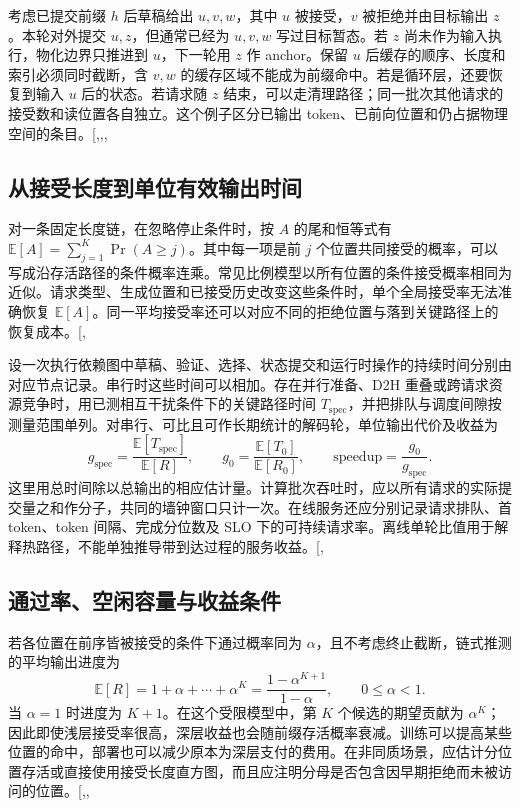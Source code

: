 \documentclass[
  a4paper,
  UTF8,
  fontset=none,
  zihao=5]{ctexart}
\begin{document}
考虑已提交前缀 \(h\) 后草稿给出 \(u,v,w\)，其中 \(u\) 被接受，\(v\)
被拒绝并由目标输出 \(z\)。本轮对外提交 \(u,z\)，但通常已经为 \(u,v,w\)
写过目标暂态。若 \(z\) 尚未作为输入执行，物化边界只推进到
\(u\)，下一轮用 \(z\) 作 anchor。保留 \(u\)
后缓存的顺序、长度和索引必须同时截断，含 \(v,w\)
的缓存区域不能成为前缀命中。若是循环层，还要恢复到输入 \(u\)
后的状态。若请求随 \(z\)
结束，可以走清理路径；同一批次其他请求的接受数和读位置各自独立。这个例子区分已输出
token、已前向位置和仍占据物理空间的条目。{[},,,\citeproc{ref-pagedattention}{34}{]}

\subsection{从接受长度到单位有效输出时间}\label{cost}

对一条固定长度链，在忽略停止条件时，按 \(A\) 的尾和恒等式有
\(\mathbb{E}[A]=\sum_{j=1}^{K}\Pr(A\ge j)\)。其中每一项是前 \(j\)
个位置共同接受的概率，可以写成沿存活路径的条件概率连乘。常见比例模型以所有位置的条件接受概率相同为近似。请求类型、生成位置和已接受历史改变这些条件时，单个全局接受率无法准确恢复
\(\mathbb{E}[A]\)。同一平均接受率还可以对应不同的拒绝位置与落到关键路径上的恢复成本。{[},\citeproc{ref-chen}{3}{]}

设一次执行依赖图中草稿、验证、选择、状态提交和运行时操作的持续时间分别由对应节点记录。串行时这些时间可以相加。存在并行准备、D2H
重叠或跨请求资源竞争时，用已测相互干扰条件下的关键路径时间
\(T_{\mathrm{spec}}\)，并把排队与调度间隙按测量范围单列。对串行、可比且可作长期统计的解码轮，单位输出代价及收益为
\[
g_{\mathrm{spec}}=\frac{\mathbb{E}[T_{\mathrm{spec}}]}{\mathbb{E}[R]},\qquad
g_0=\frac{\mathbb{E}[T_0]}{\mathbb{E}[R_0]},\qquad
\text{speedup}=\frac{g_0}{g_{\mathrm{spec}}} .
\]
这里用总时间除以总输出的相应估计量。计算批次吞吐时，应以所有请求的实际提交量之和作分子，共同的墙钟窗口只计一次。在线服务还应分别记录请求排队、首
token、token 间隔、完成分位数及 SLO
下的可持续请求率。离线单轮比值用于解释热路径，不能单独推导带到达过程的服务收益。{[},\citeproc{ref-smartspec}{6}{]}

\subsection{通过率、空闲容量与收益条件}\label{break-even}

若各位置在前序皆被接受的条件下通过概率同为
\(\alpha\)，且不考虑终止截断，链式推测的平均输出进度为 \[
\mathbb{E}[R]=1+\alpha+\cdots+\alpha^K
=\frac{1-\alpha^{K+1}}{1-\alpha},\qquad 0\leq\alpha<1.
\] 当 \(\alpha=1\) 时进度为 \(K+1\)。在这个受限模型中，第 \(K\)
个候选的期望贡献为
\(\alpha^K\)；因此即使浅层接受率很高，深层收益也会随前缀存活概率衰减。训练可以提高某些位置的命中，部署也可以减少原本为深层支付的费用。在非同质场景，应估计分位置存活或直接使用接受长度直方图，而且应注明分母是否包含因早期拒绝而未被访问的位置。{[},,\citeproc{ref-realloss}{35}{]}
\end{document}
